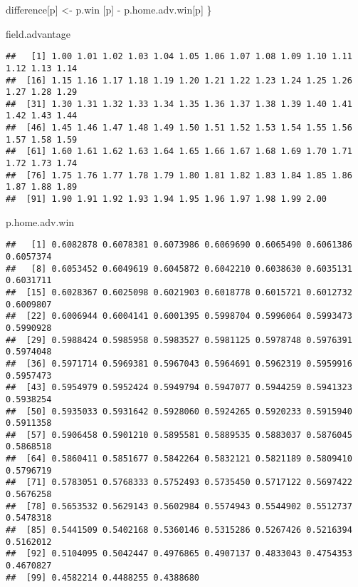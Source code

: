 \documentclass[
]{article}
\newenvironment{Shaded}{\begin{snugshade}}{\end{snugshade}}
\newcommand{\NormalTok}[1]{#1}
\newcommand{\OtherTok}[1]{\textcolor[rgb]{0.56,0.35,0.01}{#1}}
\newcommand{\SpecialCharTok}[1]{\textcolor[rgb]{0.00,0.00,0.00}{#1}}
\begin{document}
\begin{Shaded}
\begin{Highlighting}[]
\NormalTok{  difference[p] }\OtherTok{\textless{}{-}}\NormalTok{ p.win [p] }\SpecialCharTok{{-}}\NormalTok{ p.home.adv.win[p]}
\NormalTok{\}}

\NormalTok{field.advantage}
\end{Highlighting}
\end{Shaded}

\begin{verbatim}
##   [1] 1.00 1.01 1.02 1.03 1.04 1.05 1.06 1.07 1.08 1.09 1.10 1.11 1.12 1.13 1.14
##  [16] 1.15 1.16 1.17 1.18 1.19 1.20 1.21 1.22 1.23 1.24 1.25 1.26 1.27 1.28 1.29
##  [31] 1.30 1.31 1.32 1.33 1.34 1.35 1.36 1.37 1.38 1.39 1.40 1.41 1.42 1.43 1.44
##  [46] 1.45 1.46 1.47 1.48 1.49 1.50 1.51 1.52 1.53 1.54 1.55 1.56 1.57 1.58 1.59
##  [61] 1.60 1.61 1.62 1.63 1.64 1.65 1.66 1.67 1.68 1.69 1.70 1.71 1.72 1.73 1.74
##  [76] 1.75 1.76 1.77 1.78 1.79 1.80 1.81 1.82 1.83 1.84 1.85 1.86 1.87 1.88 1.89
##  [91] 1.90 1.91 1.92 1.93 1.94 1.95 1.96 1.97 1.98 1.99 2.00
\end{verbatim}

\begin{Shaded}
\begin{Highlighting}[]
\NormalTok{p.home.adv.win}
\end{Highlighting}
\end{Shaded}

\begin{verbatim}
##   [1] 0.6082878 0.6078381 0.6073986 0.6069690 0.6065490 0.6061386 0.6057374
##   [8] 0.6053452 0.6049619 0.6045872 0.6042210 0.6038630 0.6035131 0.6031711
##  [15] 0.6028367 0.6025098 0.6021903 0.6018778 0.6015721 0.6012732 0.6009807
##  [22] 0.6006944 0.6004141 0.6001395 0.5998704 0.5996064 0.5993473 0.5990928
##  [29] 0.5988424 0.5985958 0.5983527 0.5981125 0.5978748 0.5976391 0.5974048
##  [36] 0.5971714 0.5969381 0.5967043 0.5964691 0.5962319 0.5959916 0.5957473
##  [43] 0.5954979 0.5952424 0.5949794 0.5947077 0.5944259 0.5941323 0.5938254
##  [50] 0.5935033 0.5931642 0.5928060 0.5924265 0.5920233 0.5915940 0.5911358
##  [57] 0.5906458 0.5901210 0.5895581 0.5889535 0.5883037 0.5876045 0.5868518
##  [64] 0.5860411 0.5851677 0.5842264 0.5832121 0.5821189 0.5809410 0.5796719
##  [71] 0.5783051 0.5768333 0.5752493 0.5735450 0.5717122 0.5697422 0.5676258
##  [78] 0.5653532 0.5629143 0.5602984 0.5574943 0.5544902 0.5512737 0.5478318
##  [85] 0.5441509 0.5402168 0.5360146 0.5315286 0.5267426 0.5216394 0.5162012
##  [92] 0.5104095 0.5042447 0.4976865 0.4907137 0.4833043 0.4754353 0.4670827
##  [99] 0.4582214 0.4488255 0.4388680
\end{verbatim}
\end{document}
